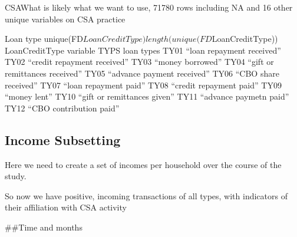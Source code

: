 \documentclass[
]{article}
\newenvironment{Shaded}{\begin{snugshade}}{\end{snugshade}}
\newcommand{\CommentTok}[1]{\textcolor[rgb]{0.56,0.35,0.01}{\textit{#1}}}
\newcommand{\DataTypeTok}[1]{\textcolor[rgb]{0.13,0.29,0.53}{#1}}
\newcommand{\KeywordTok}[1]{\textcolor[rgb]{0.13,0.29,0.53}{\textbf{#1}}}
\newcommand{\NormalTok}[1]{#1}
\newcommand{\OperatorTok}[1]{\textcolor[rgb]{0.81,0.36,0.00}{\textbf{#1}}}
\newcommand{\StringTok}[1]{\textcolor[rgb]{0.31,0.60,0.02}{#1}}
\begin{document}
CSAWhat is likely what we want to use, 71780 rows including NA and 16
other unique variables on CSA practice

Loan type unique(FD\(LoanCreditType) length(unique(FD\)LoanCreditType))
LoanCreditType variable TYPS loan types TY01 ``loan repayment received''
TY02 ``credit repayment received'' TY03 ``money borrowed'' TY04 ``gift
or remittances received'' TY05 ``advance payment received'' TY06 ``CBO
share received'' TY07 ``loan repayment paid'' TY08 ``credit repayment
paid'' TY09 ``money lent'' TY10 ``gift or remittances given'' TY11
``advance paymetn paid'' TY12 ``CBO contribution paid''

\hypertarget{income-subsetting}{%
\subsection{Income Subsetting}\label{income-subsetting}}

Here we need to create a set of incomes per household over the course of
the study.

So now we have positive, incoming transactions of all types, with
indicators of their affiliation with CSA activity

\#\#Time and months

\begin{Shaded}
\end{Shaded}
\end{document}
